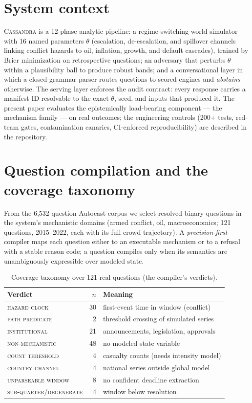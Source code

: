 \documentclass[11pt]{article}
\begin{document}
\section{System context}
\textsc{Cassandra} is a 12-phase analytic pipeline: a regime-switching world
simulator with 16 named parameters $\theta$ (escalation, de-escalation, and
spillover channels linking conflict hazards to oil, inflation, growth, and
default cascades), trained by Brier minimization on retrospective questions;
an adversary that perturbs $\theta$ within a plausibility ball to produce
robust bands; and a conversational layer in which a closed-grammar parser
routes questions to scored engines and \emph{abstains} otherwise. The
serving layer enforces the audit contract: every response carries a manifest
ID resolvable to the exact $\theta$, seed, and inputs that produced it. The
present paper evaluates the epistemically load-bearing component --- the
mechanism family --- on real outcomes; the engineering controls (200+ tests,
red-team gates, contamination canaries, CI-enforced reproducibility) are
described in the repository.

\section{Question compilation and the coverage taxonomy}
\label{sec:compiler}
From the 6{,}532-question Autocast corpus we select resolved binary questions
in the system's mechanistic domains (armed conflict, oil, macroeconomics; 121
questions, 2015--2022, each with its full crowd trajectory). A
\emph{precision-first} compiler maps each question either to an executable
mechanism or to a refusal with a stable reason code; a question compiles only
when its semantics are unambiguously expressible over modeled state.

\begin{table}[h]\centering
\caption{Coverage taxonomy over 121 real questions (the compiler's verdicts).}
\label{tab:coverage}
\begin{tabular}{lrl}
\toprule
Verdict & $n$ & Meaning \\
\midrule
\textsc{hazard clock}      & 30 & first-event time in window (conflict) \\
\textsc{path predicate}    & 2  & threshold crossing of simulated series \\
\midrule
\textsc{institutional}     & 21 & announcements, legislation, approvals \\
\textsc{non-mechanistic}   & 48 & no modeled state variable \\
\textsc{count threshold}   & 4  & casualty counts (needs intensity model) \\
\textsc{country channel}   & 4  & national series outside global model \\
\textsc{unparseable window}& 8  & no confident deadline extraction \\
\textsc{sub-quarter/degenerate} & 4 & window below resolution \\
\bottomrule
\end{tabular}
\end{table}
\end{document}
